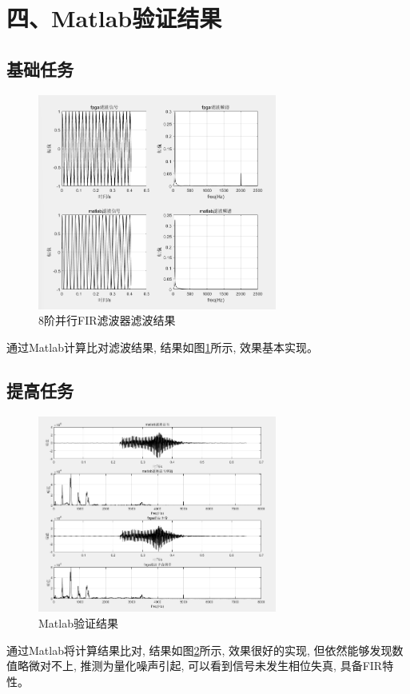\documentclass{article}
\newcommand{\fourhao}{\fontsize{14pt}{\baselineskip}\selectfont} %
\newcommand{\xiaosihao}{\fontsize{12pt}{\baselineskip}\selectfont} %
\begin{document}
\section*{\fourhao 四、Matlab验证结果}
\xiaosihao
{}
\subsection*{基础任务}
\begin{figure}[htbp]
    \centering
    \includegraphics[width=0.7\textwidth]{image/2024-06-27-02-30-22.png}
    \caption{8阶并行FIR滤波器滤波结果}
    \label{image_verify_base_1}
\end{figure}
通过Matlab计算比对滤波结果, 结果如图\ref{image_verify_base_1}所示, 效果基本实现。
\subsection*{提高任务}
\begin{figure}[H]
    \centering
    \includegraphics[width=0.7\textwidth]{image/2024-06-26-21-45-09.png}
    \caption{Matlab验证结果}
    \label{image_verify_improve_1}
\end{figure}
通过Matlab将计算结果比对, 结果如图\ref{image_verify_improve_1}所示, 效果很好的实现, 
但依然能够发现数值略微对不上, 推测为量化噪声引起, 可以看到信号未发生相位失真, 具备FIR特性。
\end{document}
